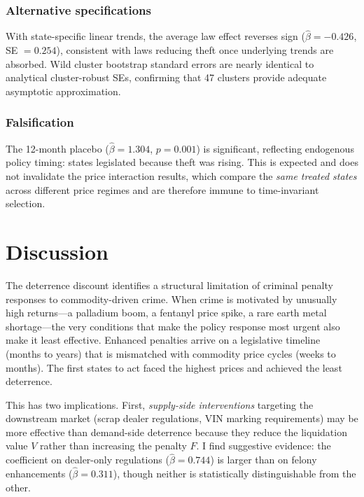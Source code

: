 \documentclass[12pt]{article}
\begin{document}
\subsubsection*{Alternative specifications} With state-specific linear trends, the average law effect reverses sign ($\hat{\beta} = -0.426$, SE $= 0.254$), consistent with laws reducing theft once underlying trends are absorbed. Wild cluster bootstrap standard errors are nearly identical to analytical cluster-robust SEs, confirming that 47 clusters provide adequate asymptotic approximation.

\subsubsection*{Falsification} The 12-month placebo ($\hat{\beta} = 1.304$, $p = 0.001$) is significant, reflecting endogenous policy timing: states legislated because theft was rising. This is expected and does not invalidate the price interaction results, which compare the \textit{same treated states} across different price regimes and are therefore immune to time-invariant selection.



\section{Discussion}

The deterrence discount identifies a structural limitation of criminal penalty responses to commodity-driven crime. When crime is motivated by unusually high returns---a palladium boom, a fentanyl price spike, a rare earth metal shortage---the very conditions that make the policy response most urgent also make it least effective. Enhanced penalties arrive on a legislative timeline (months to years) that is mismatched with commodity price cycles (weeks to months). The first states to act faced the highest prices and achieved the least deterrence.

This has two implications. First, \textit{supply-side interventions} targeting the downstream market (scrap dealer regulations, VIN marking requirements) may be more effective than demand-side deterrence because they reduce the liquidation value $V$ rather than increasing the penalty $F$. I find suggestive evidence: the coefficient on dealer-only regulations ($\hat{\beta} = 0.744$) is larger than on felony enhancements ($\hat{\beta} = 0.311$), though neither is statistically distinguishable from the other.
\end{document}
